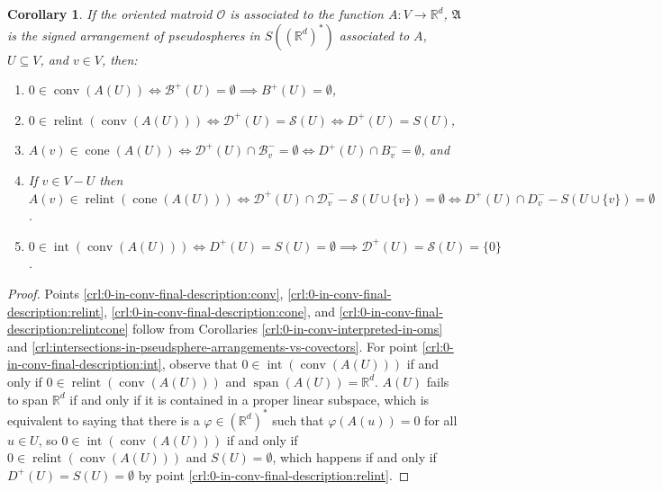 \documentclass[a4paper,11pt,reqno, english]{amsart}
\newtheorem{corollary}[theorem]{Corollary}
\theoremstyle{definition}
\theoremstyle{remark}
\newcommand\R{\mathbb R}
\DeclareMathOperator{\cone}{\mathrm{cone}}
\DeclareMathOperator{\interior}{\mathrm{int}}
\DeclareMathOperator{\relint}{\mathrm{relint}}
\DeclareMathOperator{\conv}{\mathrm{conv}}
\begin{document}
\begin{corollary}\label{crl:0-in-conv-final-description}
    If the oriented matroid $\mathscr{O}$ is associated to the function $A\colon V\to\R^d$, $\mathfrak{A}$ is the signed arrangement of pseudospheres in $S((\R^d)^*)$ associated to $A$, $U\subseteq V$, and $v\in V$, then:
    \begin{enumerate}[label=\normalfont{(\arabic*)}]
        \item\label{crl:0-in-conv-final-description:conv} $0\in\conv(A(U))\iff \mathscr{B}^+(U)=\emptyset\implies B^+(U)=\emptyset$,
        \item\label{crl:0-in-conv-final-description:relint} $0\in\relint(\conv(A(U)))\iff \mathscr{D}^+(U)=\mathscr{S}(U)\iff D^+(U)=S(U)$,
        \item\label{crl:0-in-conv-final-description:cone} $A(v)\in\cone(A(U))\iff\mathscr{D}^+(U)\cap\mathscr{B}^-_v=\emptyset\iff D^+(U)\cap B^-_v=\emptyset$, and
        \item\label{crl:0-in-conv-final-description:relintcone} If $v\in V-U$ then $A(v)\in\relint(\cone(A(U)))\iff\mathscr{D}^+(U)\cap\mathscr{D}^-_v-\mathscr{S}(U\cup\{v\})=\emptyset\iff D^+(U)\cap D^-_v-S(U\cup\{v\})=\emptyset$.
        \item\label{crl:0-in-conv-final-description:int} $0\in\interior(\conv(A(U)))\iff D^+(U)=S(U)=\emptyset\implies\mathscr{D}^+(U)=\mathscr{S}(U)=\{0\}$.
    \end{enumerate}
\end{corollary}
\begin{proof}
    Points \ref{crl:0-in-conv-final-description:conv}, \ref{crl:0-in-conv-final-description:relint}, \ref{crl:0-in-conv-final-description:cone}, and \ref{crl:0-in-conv-final-description:relintcone} follow from Corollaries \ref{crl:0-in-conv-interpreted-in-oms} and \ref{crl:intersections-in-pseudsphere-arrangements-vs-covectors}.
    For point \ref{crl:0-in-conv-final-description:int}, observe that $0\in\interior(\conv(A(U)))$ if and only if $0\in\relint(\conv(A(U)))$ and $\operatorname{span}(A(U))=\R^d$. $A(U)$ fails to span $\R^d$ if and only if it is contained in a proper linear subspace, which is equivalent to saying that there is a $\varphi\in(\R^d)^*$ such that $\varphi(A(u))=0$ for all $u\in U$, so $0\in\interior(\conv(A(U)))$ if and only if $0\in\relint(\conv(A(U)))$ and $S(U)=\emptyset$, which happens if and only if $D^+(U)=S(U)=\emptyset$ by point \ref{crl:0-in-conv-final-description:relint}.
\end{proof}
\end{document}
